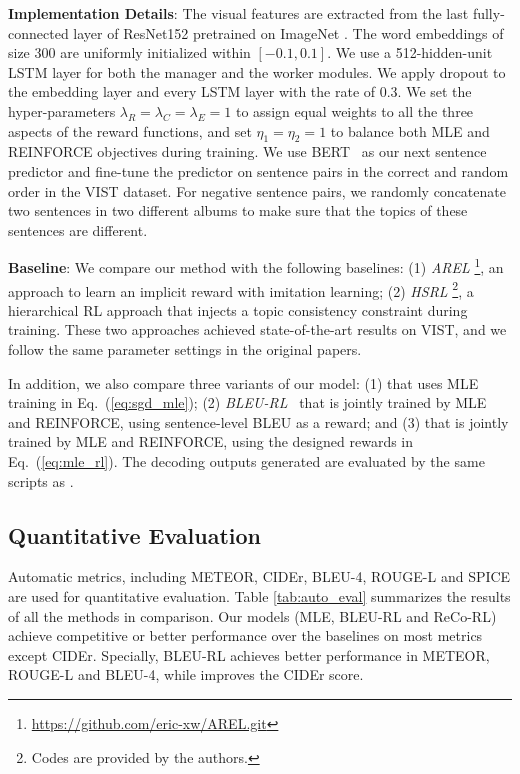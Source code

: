 \documentclass[letterpaper]{article} \usepackage{aaai20}  \usepackage{times}  \usepackage{helvet} \usepackage{courier}  \usepackage[hyphens]{url}  \usepackage{graphicx} \urlstyle{rm} \def\UrlFont{\rm}  \usepackage{graphicx}  \frenchspacing  \setlength{\pdfpagewidth}{8.5in}  \setlength{\pdfpageheight}{11in}  \usepackage{times}
\newcommand{\bleu}{BLEU-RL }
\newcommand{\citet}[1]{\citeauthor{#1} \shortcite{#1}}
\begin{document}
\noindent \textbf{Implementation Details}: The visual features are extracted from the last fully-connected layer of ResNet152 pretrained on ImageNet \cite{he2016deep}. The word embeddings of size 300 are uniformly initialized within $[-0.1,0.1]$. We use a 512-hidden-unit LSTM layer for both the manager and the worker modules. We apply dropout to the embedding layer and every LSTM layer with the rate of 0.3.  We set the hyper-parameters $\lambda_R = \lambda_C = \lambda_E = 1$ to assign equal weights to all the three aspects of the reward functions, and set $\eta_1 = \eta_2 = 1$ to balance both MLE and REINFORCE objectives during training. We use BERT~\cite{devlin2018bert} as our next sentence predictor and fine-tune the predictor on sentence pairs in the correct and random order in the VIST dataset. For negative sentence pairs, we randomly concatenate two sentences in two different albums to make sure that the topics of these sentences are different. 

\noindent \textbf{Baseline}: We compare our method with the following baselines:
(1) \textit{AREL} \cite{xinwang-wenhuchen-ACL-2018}\footnote{\url{https://github.com/eric-xw/AREL.git}}, an approach to learn an implicit reward with imitation learning;
(2) \textit{HSRL} \cite{huang2018hierarchically}\footnote{Codes are provided by the authors.}, a hierarchical RL approach that injects a topic consistency constraint during training. 
These two approaches achieved state-of-the-art results on VIST, and we follow the same parameter settings in the original papers. 

In addition, we also compare three variants of our model: (1) \textit{\mle} that uses MLE training in Eq.~(\ref{eq:sgd_mle}); (2) \textit{\bleu}~that is jointly trained by MLE and REINFORCE, using sentence-level BLEU as a reward; and (3) \textit{\model} that is jointly trained by MLE and REINFORCE, using the designed rewards in Eq.~(\ref{eq:mle_rl}). The decoding outputs generated are evaluated by the same scripts as \citet{xinwang-wenhuchen-ACL-2018}. 

\subsection{Quantitative Evaluation} 
Automatic metrics, including METEOR, CIDEr, BLEU-4, ROUGE-L and SPICE are used for quantitative evaluation. Table \ref{tab:auto_eval} summarizes the results of all the methods in comparison. Our models (MLE, \bleu and ReCo-RL) achieve competitive or better performance over the baselines on most metrics except CIDEr. Specially, \bleu achieves better performance in METEOR, ROUGE-L and BLEU-4, while \model improves the CIDEr score.
\end{document}
